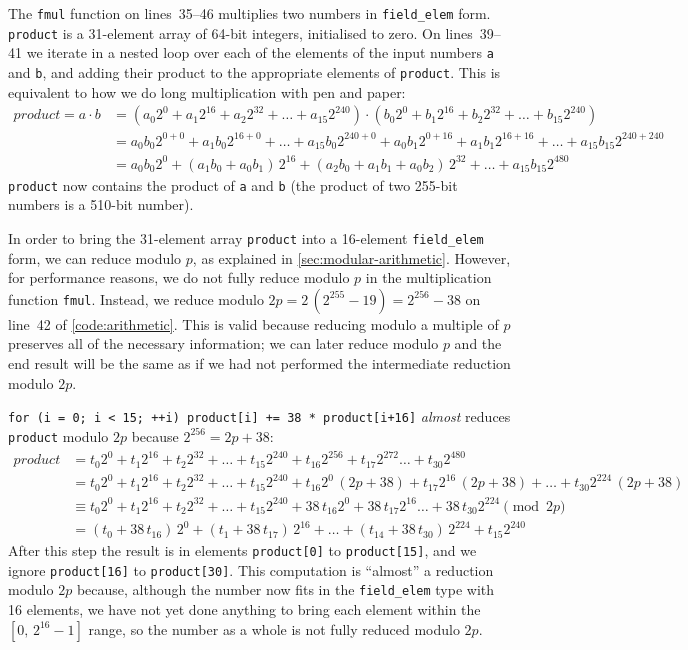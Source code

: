 \documentclass[manuscript]{acmart}
\begin{document}
The \verb|fmul| function on lines~35--46 multiplies two numbers in \verb|field_elem| form.
\verb|product| is a 31-element array of 64-bit integers, initialised to zero.
On lines~39--41 we iterate in a nested loop over each of the elements of the input numbers \verb|a| and \verb|b|, and adding their product to the appropriate elements of \verb|product|.
This is equivalent to how we do long multiplication with pen and paper:
\begin{align}
    \mathit{product} = a \cdot b &= (a_0 2^0 + a_1 2^{16} + a_2 2^{32} + \dots + a_{15} 2^{240}) \cdot (b_0 2^0 + b_1 2^{16} + b_2 2^{32} + \dots + b_{15} 2^{240}) \nonumber\\
    &= a_0 b_0 2^{0+0} + a_1 b_0 2^{16+0} + \dots + a_{15} b_0 2^{240+0} + a_0 b_1 2^{0+16} + a_1 b_1 2^{16+16} + \dots + a_{15} b_{15} 2^{240+240} \nonumber\\
    &= a_0 b_0 2^0 + (a_1 b_0 + a_0 b_1)\, 2^{16} + (a_2 b_0 + a_1 b_1 + a_0 b_2)\, 2^{32} + \dots + a_{15} b_{15} 2^{480} \label{eq:multiplication}
\end{align}
\verb|product| now contains the product of \verb|a| and \verb|b| (the product of two 255-bit numbers is a 510-bit number).

In order to bring the 31-element array \verb|product| into a 16-element \verb|field_elem| form, we can reduce modulo $p$, as explained in \autoref{sec:modular-arithmetic}.
However, for performance reasons, we do not fully reduce modulo $p$ in the multiplication function \verb|fmul|.
Instead, we reduce modulo $2p = 2\,(2^{255} - 19) = 2^{256} - 38$ on line~42 of \autoref{code:arithmetic}.
This is valid because reducing modulo a multiple of $p$ preserves all of the necessary information; we can later reduce modulo $p$ and the end result will be the same as if we had not performed the intermediate reduction modulo $2p$.

\verb|for (i = 0; i < 15; ++i) product[i] += 38 * product[i+16]| \emph{almost} reduces \verb|product| modulo $2p$ because $2^{256} = 2p + 38$:
\begin{align}
    \mathit{product} &= t_0 2^0 + t_1 2^{16} + t_2 2^{32} + \dots + t_{15} 2^{240} + t_{16} 2^{256} + t_{17} 2^{272} \dots + t_{30} 2^{480} \nonumber\\
    &= t_0 2^0 + t_1 2^{16} + t_2 2^{32} + \dots + t_{15} 2^{240} + t_{16} 2^0\, (2p + 38) + t_{17} 2^{16}\, (2p + 38) + \dots + t_{30} 2^{224}\, (2p + 38) \nonumber\\
    &\equiv t_0 2^0 + t_1 2^{16} + t_2 2^{32} + \dots + t_{15} 2^{240} + 38\, t_{16} 2^0 + 38\, t_{17} 2^{16} \dots + 38\, t_{30} 2^{224} \pmod{2p} \nonumber\\
    &= (t_0 + 38\, t_{16})\, 2^0 + (t_1 + 38\, t_{17})\, 2^{16} + \dots + (t_{14} + 38\, t_{30})\, 2^{224} + t_{15} 2^{240} \label{eq:reduce-2p}
\end{align}
After this step the result is in elements \verb|product[0]| to \verb|product[15]|, and we ignore \verb|product[16]| to \verb|product[30]|.
This computation is ``almost'' a reduction modulo $2p$ because, although the number now fits in the \verb|field_elem| type with 16 elements, we have not yet done anything to bring each element within the $[0,\, 2^{16}-1]$ range, so the number as a whole is not fully reduced modulo $2p$.
\end{document}
